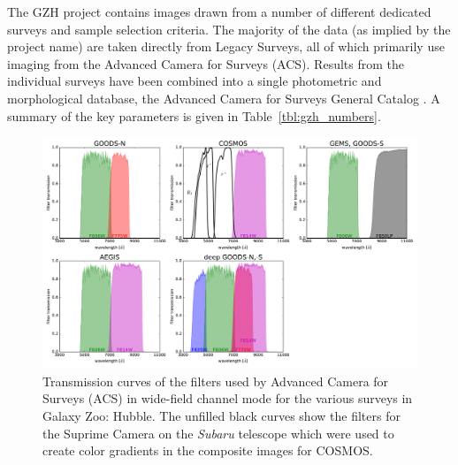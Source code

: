 \documentclass[twocolumn]{aastex6}
\begin{document}
The GZH project contains images drawn from a number of different dedicated surveys and sample selection criteria. The majority of the data (as implied by the project name) are taken directly from \hst{} Legacy Surveys, all of which primarily use imaging from the Advanced Camera for Surveys (ACS). Results from the individual surveys have been combined into a single photometric and morphological database, the Advanced Camera for Surveys General Catalog \citep[ACS-GC;][]{gri12}. A summary of the key parameters is given in Table~\ref{tbl:gzh_numbers}.

\begin{figure}
\center
\includegraphics[width=160mm]{figures/filter_curves.pdf}
\caption{Transmission curves of the filters used by \hst{} Advanced Camera for Surveys (ACS) in wide-field channel mode for the various surveys in Galaxy Zoo: Hubble. The unfilled black curves show the filters for the Suprime Camera on the \textit{Subaru} telescope which were used to create color gradients in the composite images for COSMOS.\label{fig:filtercurves}}
\end{figure}
\end{document}
